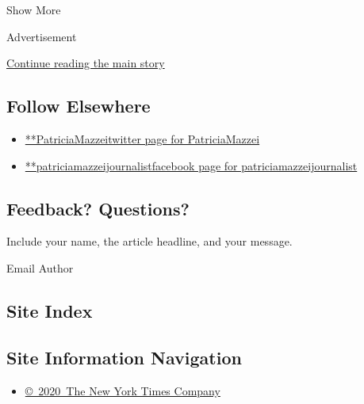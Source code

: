 Show More

Advertisement

\protect\hyperlink{after-mid2}{Continue reading the main story}

\hypertarget{follow-elsewhere}{%
\subsection{Follow Elsewhere}\label{follow-elsewhere}}

\begin{itemize}
\tightlist
\item
  \href{https://twitter.com/PatriciaMazzei}{**PatriciaMazzeitwitter page
  for PatriciaMazzei}
\item
  \href{https://www.facebookcorewwwi.onion/patriciamazzeijournalist}{**patriciamazzeijournalistfacebook
  page for patriciamazzeijournalist}
\end{itemize}

\hypertarget{feedback-questions}{%
\subsection{Feedback? Questions?}\label{feedback-questions}}

Include your name, the article headline, and your message.

Email Author

\hypertarget{site-index}{%
\subsection{Site Index}\label{site-index}}

\hypertarget{site-information-navigation}{%
\subsection{Site Information
Navigation}\label{site-information-navigation}}

\begin{itemize}
\tightlist
\item
  \href{https://help.nytimes3xbfgragh.onion/hc/en-us/articles/115014792127-Copyright-notice}{©~2020~The
  New York Times Company}
\end{itemize}

